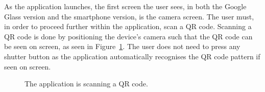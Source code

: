 As the application launches, the first screen the user sees, in both the Google Glass version and the smartphone version, is the camera screen. The user must, in order to proceed further within the application, scan a QR code. Scanning a QR code is done by positioning the device's camera such that the QR code can be seen on screen, as seen in Figure~\ref{glassDemoQR}. The user does not need to press any shutter button as the application automatically recognises the QR code pattern if seen on screen.%

	
	\begin{figure}[ht!]
		\centering
   		 \qquad
   		 \qquad
		\caption{The application is scanning a QR code.}
		\label{glassDemoQR}
	\end{figure}

